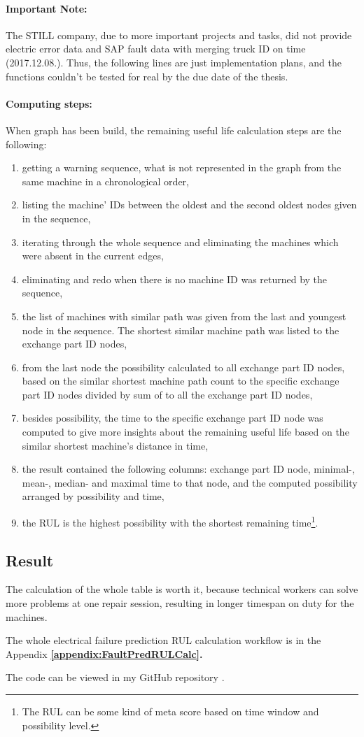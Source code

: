 			\paragraph{Important Note:}
			The STILL company, due to more important projects and tasks, did not provide electric error data and SAP fault data with merging truck ID on time (2017.12.08.). Thus, the following lines are just implementation plans, and the functions couldn't be tested for real by the due date of the thesis.
			\paragraph{Computing steps:}
			When graph has been build, the remaining useful life calculation steps are the following:
			\begin{enumerate}
				\item{getting a warning sequence, what is not represented in the graph from the same machine in a chronological order,}
				\item{listing the machine' IDs between the oldest and the second oldest nodes given in the sequence,}
				\item{iterating through the whole sequence and eliminating the machines which were absent in the current edges,}
				\item{eliminating and redo when there is no machine ID was returned by the sequence,}
				\item{the list of machines with similar path was given from the last and youngest node in the sequence. The shortest similar machine path was listed to the exchange part ID nodes,}
				\item{from the last node the possibility calculated to all exchange part ID nodes, based on the similar shortest machine path count to the specific exchange part ID nodes divided by sum of to all the exchange part ID nodes,}
				\item{besides possibility, the time to the specific exchange part ID node was computed to give more insights about the remaining useful life based on the similar shortest machine's distance in time,}
				\item{the result contained the following columns: exchange part ID node, minimal-, mean-, median- and maximal time to that node, and the computed possibility arranged by possibility and time,} 
		 		\item{the RUL is the highest possibility with the shortest remaining time\footnote{The RUL can be some kind of meta score based on time window and possibility level.}.}
		 	\end{enumerate}
	\subsection{Result}
The calculation of the whole table is worth it, because technical workers can solve more problems at one repair session, resulting in longer timespan on duty for the machines.

The whole electrical failure prediction RUL calculation workflow is in the Appendix \textbf{\ref{appendix:FaultPredRULCalc}.}

The code can be viewed in my GitHub repository \cite{GitHub_FP_RUL}.